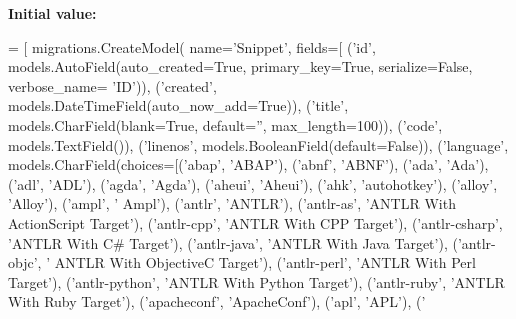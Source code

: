 {\bfseries Initial value\+:}
\begin{DoxyCode}
=  [
        migrations.CreateModel(
            name=\textcolor{stringliteral}{'Snippet'},
            fields=[
                (\textcolor{stringliteral}{'id'}, models.AutoField(auto\_created=\textcolor{keyword}{True}, primary\_key=\textcolor{keyword}{True}, serialize=\textcolor{keyword}{False}, verbose\_name=\textcolor{stringliteral}{
      'ID'})),
                (\textcolor{stringliteral}{'created'}, models.DateTimeField(auto\_now\_add=\textcolor{keyword}{True})),
                (\textcolor{stringliteral}{'title'}, models.CharField(blank=\textcolor{keyword}{True}, default=\textcolor{stringliteral}{''}, max\_length=100)),
                (\textcolor{stringliteral}{'code'}, models.TextField()),
                (\textcolor{stringliteral}{'linenos'}, models.BooleanField(default=\textcolor{keyword}{False})),
                (\textcolor{stringliteral}{'language'}, models.CharField(choices=[(\textcolor{stringliteral}{'abap'}, \textcolor{stringliteral}{'ABAP'}), (\textcolor{stringliteral}{'abnf'}, \textcolor{stringliteral}{'ABNF'}), (\textcolor{stringliteral}{'ada'}, \textcolor{stringliteral}{'Ada'}), 
      (\textcolor{stringliteral}{'adl'}, \textcolor{stringliteral}{'ADL'}), (\textcolor{stringliteral}{'agda'}, \textcolor{stringliteral}{'Agda'}), (\textcolor{stringliteral}{'aheui'}, \textcolor{stringliteral}{'Aheui'}), (\textcolor{stringliteral}{'ahk'}, \textcolor{stringliteral}{'autohotkey'}), (\textcolor{stringliteral}{'alloy'}, \textcolor{stringliteral}{'Alloy'}), (\textcolor{stringliteral}{'ampl'}, \textcolor{stringliteral}{'
      Ampl'}), (\textcolor{stringliteral}{'antlr'}, \textcolor{stringliteral}{'ANTLR'}), (\textcolor{stringliteral}{'antlr-as'}, \textcolor{stringliteral}{'ANTLR With ActionScript Target'}), (\textcolor{stringliteral}{'antlr-cpp'}, \textcolor{stringliteral}{'ANTLR With CPP
       Target'}), (\textcolor{stringliteral}{'antlr-csharp'}, \textcolor{stringliteral}{'ANTLR With C# Target'}), (\textcolor{stringliteral}{'antlr-java'}, \textcolor{stringliteral}{'ANTLR With Java Target'}), (\textcolor{stringliteral}{'antlr-objc'}, \textcolor{stringliteral}{'
      ANTLR With ObjectiveC Target'}), (\textcolor{stringliteral}{'antlr-perl'}, \textcolor{stringliteral}{'ANTLR With Perl Target'}), (\textcolor{stringliteral}{'antlr-python'}, \textcolor{stringliteral}{'ANTLR With Python
       Target'}), (\textcolor{stringliteral}{'antlr-ruby'}, \textcolor{stringliteral}{'ANTLR With Ruby Target'}), (\textcolor{stringliteral}{'apacheconf'}, \textcolor{stringliteral}{'ApacheConf'}), (\textcolor{stringliteral}{'apl'}, \textcolor{stringliteral}{'APL'}), (\textcolor{stringliteral}{'
}
\end{DoxyCode}
